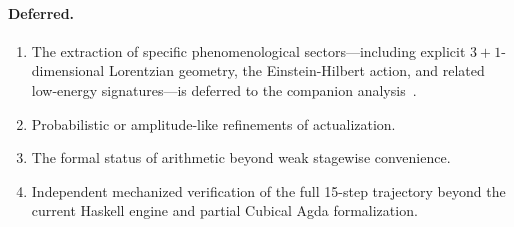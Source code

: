 \documentclass[11pt,a4paper]{article}
\theoremstyle{plain}
\theoremstyle{definition}
\theoremstyle{remark}
\begin{document}
\paragraph{Deferred.}
\begin{enumerate}[nosep]
    \item The extraction of specific phenomenological sectors---including explicit $3+1$-dimensional Lorentzian geometry, the Einstein-Hilbert action, and related low-energy signatures---is deferred to the companion analysis~\cite{pen_companion2026}.
    \item Probabilistic or amplitude-like refinements of actualization.
    \item The formal status of arithmetic beyond weak stagewise convenience.
    \item Independent mechanized verification of the full 15-step trajectory beyond the current Haskell engine and partial Cubical Agda formalization.
\end{enumerate}
\end{document}
